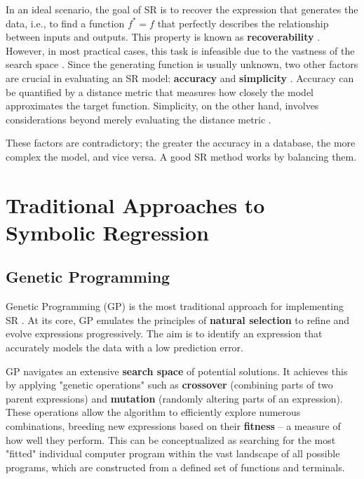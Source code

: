 In an ideal scenario, the goal of SR is to recover the expression that generates the data, i.e., to find a function \(f^* = f\) that perfectly describes the relationship between inputs and outputs. This property is known as \textbf{recoverability} \cite{guimera2020bayesian, tohme2022gsr}. However, in most practical cases, this task is infeasible due to the vastness of the search space \cite{petersen2020deep}. Since the generating function is usually unknown, two other factors are crucial in evaluating an SR model: \textbf{accuracy} and \textbf{simplicity} \cite{guimera2020bayesian, lacava2021contemporary}. Accuracy can be quantified by a distance metric that measures how closely the model approximates the target function. Simplicity, on the other hand, involves considerations beyond merely evaluating the distance metric \cite{lacava2021contemporary}.

These factors are contradictory; the greater the accuracy in a database, the more complex the model, and vice versa. A good SR method works by balancing them.

    \section{Traditional Approaches to Symbolic Regression}
        \subsection{Genetic Programming}

        Genetic Programming (GP) is the most traditional approach for implementing SR \cite{lacava2021contemporary}. At its core, GP emulates the principles of \textbf{natural selection} to refine and evolve expressions progressively. The aim is to identify an expression that accurately models the data with a low prediction error.
        
        GP navigates an extensive \textbf{search space} of potential solutions. It achieves this by applying "genetic operations" such as \textbf{crossover} (combining parts of two parent expressions) and \textbf{mutation} (randomly altering parts of an expression). These operations allow the algorithm to efficiently explore numerous combinations, breeding new expressions based on their \textbf{fitness} – a measure of how well they perform. This can be conceptualized as searching for the most "fitted" individual computer program within the vast landscape of all possible programs, which are constructed from a defined set of functions and terminals. 
        
